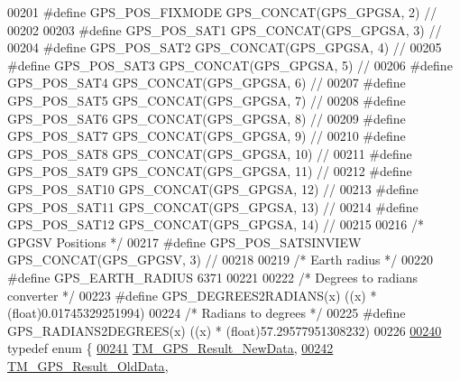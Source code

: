 \begin{DoxyCode}
00201 \textcolor{preprocessor}{#define GPS\_POS\_FIXMODE         GPS\_CONCAT(GPS\_GPGSA, 2)    //}
00202 
00203 \textcolor{preprocessor}{#define GPS\_POS\_SAT1            GPS\_CONCAT(GPS\_GPGSA, 3)    //}
00204 \textcolor{preprocessor}{#define GPS\_POS\_SAT2            GPS\_CONCAT(GPS\_GPGSA, 4)    //}
00205 \textcolor{preprocessor}{#define GPS\_POS\_SAT3            GPS\_CONCAT(GPS\_GPGSA, 5)    //}
00206 \textcolor{preprocessor}{#define GPS\_POS\_SAT4            GPS\_CONCAT(GPS\_GPGSA, 6)    //}
00207 \textcolor{preprocessor}{#define GPS\_POS\_SAT5            GPS\_CONCAT(GPS\_GPGSA, 7)    //}
00208 \textcolor{preprocessor}{#define GPS\_POS\_SAT6            GPS\_CONCAT(GPS\_GPGSA, 8)    //}
00209 \textcolor{preprocessor}{#define GPS\_POS\_SAT7            GPS\_CONCAT(GPS\_GPGSA, 9)    //}
00210 \textcolor{preprocessor}{#define GPS\_POS\_SAT8            GPS\_CONCAT(GPS\_GPGSA, 10)   //}
00211 \textcolor{preprocessor}{#define GPS\_POS\_SAT9            GPS\_CONCAT(GPS\_GPGSA, 11)   //}
00212 \textcolor{preprocessor}{#define GPS\_POS\_SAT10           GPS\_CONCAT(GPS\_GPGSA, 12)   //}
00213 \textcolor{preprocessor}{#define GPS\_POS\_SAT11           GPS\_CONCAT(GPS\_GPGSA, 13)   //}
00214 \textcolor{preprocessor}{#define GPS\_POS\_SAT12           GPS\_CONCAT(GPS\_GPGSA, 14)   //}
00215 
00216 \textcolor{comment}{/* GPGSV Positions */}
00217 \textcolor{preprocessor}{#define GPS\_POS\_SATSINVIEW      GPS\_CONCAT(GPS\_GPGSV, 3)    //}
00218 
00219 \textcolor{comment}{/* Earth radius */}
00220 \textcolor{preprocessor}{#define GPS\_EARTH\_RADIUS        6371}
00221 
00222 \textcolor{comment}{/* Degrees to radians converter */}
00223 \textcolor{preprocessor}{#define GPS\_DEGREES2RADIANS(x)  ((x) * (float)0.01745329251994)}
00224 \textcolor{comment}{/* Radians to degrees */}
00225 \textcolor{preprocessor}{#define GPS\_RADIANS2DEGREES(x)  ((x) * (float)57.29577951308232)}
00226 
\hypertarget{tm__stm32f4__gps_8h_source_l00240}{}\hyperlink{group___t_m___g_p_s___typedefs_gaf3a9184315a145cb8288691c9c529427}{00240} \textcolor{keyword}{typedef} \textcolor{keyword}{enum} \{
\hypertarget{tm__stm32f4__gps_8h_source_l00241}{}\hyperlink{group___t_m___g_p_s___typedefs_ggaf3a9184315a145cb8288691c9c529427a53532f11f7d268cfe75af5360985ff34}{00241}     \hyperlink{group___t_m___g_p_s___typedefs_ggaf3a9184315a145cb8288691c9c529427a53532f11f7d268cfe75af5360985ff34}{TM\_GPS\_Result\_NewData},          
\hypertarget{tm__stm32f4__gps_8h_source_l00242}{}\hyperlink{group___t_m___g_p_s___typedefs_ggaf3a9184315a145cb8288691c9c529427a5098e6636e25483bc0580f8d947a0ff8}{00242}     \hyperlink{group___t_m___g_p_s___typedefs_ggaf3a9184315a145cb8288691c9c529427a5098e6636e25483bc0580f8d947a0ff8}{TM\_GPS\_Result\_OldData},          

\end{DoxyCode}
